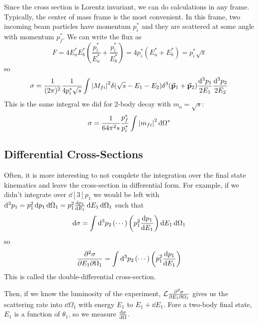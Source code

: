 \documentclass[a4paper,twoside,master.tex]{subfiles}
\begin{document}

Since the cross section is Lorentz invariant, we can do calculations in any frame. Typically, the center of mass frame is the most convenient. In this frame, two incoming beam particles have momentum $ p^*_i $ and they are scattered at some angle with momentum $ p^*_f $. We can write the flux as
\begin{equation}
    F = 4 E_a^* E_b^* \left( \frac{p_i^*}{E_a^*} + \frac{p_i^*}{E_b^*} \right) = 4 p_i^*(E_a^* + E_b^*) = p_i^* \sqrt{s}
\end{equation}
so
\begin{equation}
    \sigma = \frac{1}{(2 \pi)^2} \frac{1}{4 p_i^* \sqrt{s}} \int \abs{M_{f i}}^2 \delta(\sqrt{s} - E_1 - E_2) \delta^3(\va{p}_1 + \va{p}_2) \frac{\dd[3]{p_1}}{2 E_1} \frac{\dd[3]{p_2}}{2 E_2}
\end{equation}
This is the same integral we did for $ 2 $-body decay with $ m_a = \sqrt{s} $:
\begin{equation}
    \sigma = \frac{1}{64 \pi^2 s} \frac{p_f^*}{p_i^*} \int \abs{m_{f i}}^2 \dd{\Omega^*}
\end{equation}

\subsection{Differential Cross-Sections}\label{sub:differential_cross-sections}

Often, it is more interesting to not complete the integration over the final state kinematics and leave the cross-section in differential form. For example, if we didn't integrate over $ \dd[3]{p_1} $ we would be left with $ \dd[3]{p_1}= p_1^2 \dd{p_1} \dd{\Omega_1} = p_1^2 \dv{p_1}{E_1} \dd{E_1} \dd{\Omega_1} $ such that
\begin{equation}
    \dd{\sigma} = \int \dd[3]{p_2}\left( \cdots \right) \left( p_1^2 \dv{p_1}{E_1} \right) \dd{E_1} \dd{\Omega_1}
\end{equation}
so
\begin{equation}
    \pdv{\sigma}{E_1}{\Omega_1}= \int \dd[3]{p_2} \left( \cdots \right) \left( p_1^2 \dv{p_1}{E_1} \right)
\end{equation}
This is called the double-differential cross-section.

Then, if we know the luminosity of the experiment, $ \mathcal{L} \pdv{\sigma}{E_1}{\Omega_1} $ gives us the scattering rate into $ \dd{\Omega_1} $ with energy $ E_1 $ to $ E_1 + \dd{E_1} $. Fore a two-body final state, $ E_1 $ is a function of $ \theta_1 $, so we measure $ \dv{\sigma}{\Omega} $. 
\end{document}
